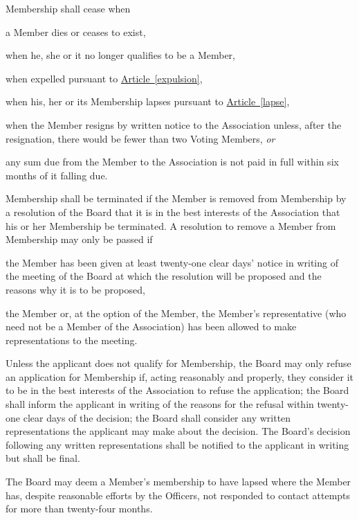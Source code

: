 \documentclass[12pt]{article}
\newcommand{\EC}[0]{Board}
\newcommand{\Exec}[0]{\EC{} }
\newcommand{\ITor}[0]{\textit{or}}
\newcommand{\articleref}[1]{\hyperref[#1]{Article~\ref*{#1}}}
\begin{document}
\begin{constenum}

  \item
    Membership shall cease when
    \begin{constenum}
      \item a Member dies or ceases to exist,
      \item when he, she or it no longer qualifies to be a Member,
      \item when expelled pursuant to \articleref{expulsion},
      \item when his, her or its Membership lapses pursuant to
        \articleref{lapse},
      \item when the Member resigns by written notice to the
        Association unless, after the resignation, there would be
        fewer than two Voting Members, \ITor{}
      \item any sum due from the Member to the Association is not paid in full
        within six months of it falling due.
    \end{constenum}

\item Membership shall be terminated if
\label{expulsion}
  the Member is removed from Membership by a resolution of the
  \Exec that it is in the best interests of the Association that his or
  her Membership be terminated. A resolution to remove a Member from
  Membership may only be passed if

\begin{constenum}

\item the Member has been given at least twenty-one clear days' notice in
  writing of the meeting of the \Exec at which the resolution will
  be proposed and the reasons why it is to be proposed,

\item the Member or, at the option of the Member, the Member's
  representative (who need not be a Member of the Association) has been
  allowed to make representations to the meeting.

\end{constenum}

\item
  Unless the applicant does not qualify for Membership, the \Exec
  may only refuse an application for Membership if, acting
  reasonably and properly, they consider it to be in the best
  interests of the Association to refuse the application; the \Exec
  shall inform the applicant in writing of the reasons for the
  refusal within twenty-one clear days of the decision; the \Exec
  shall consider any written representations the applicant may make
  about the decision. The \EC's decision following any written
  representations shall be notified to the applicant in writing but
  shall be final.

\item The \Exec may deem a Member's membership to have lapsed where
  the Member has, despite reasonable efforts by the Officers, not
  responded to contact attempts for more than twenty-four months.
  \label{lapse}

\end{constenum}
\end{document}
